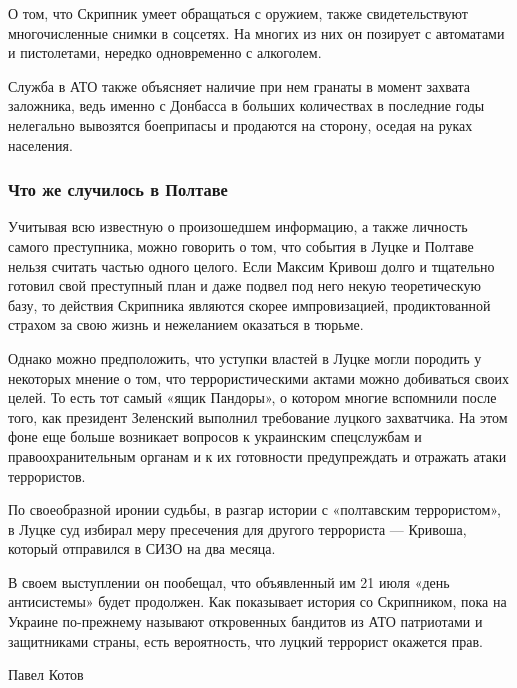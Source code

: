 \documentclass[a4paper,11pt]{extreport}
\begin{document}
О том, что Скрипник умеет обращаться с оружием, также свидетельствуют
многочисленные снимки в соцсетях. На многих из них он позирует с автоматами и
пистолетами, нередко одновременно с алкоголем.

Служба в АТО также объясняет наличие при нем гранаты в момент захвата
заложника, ведь именно с Донбасса в больших количествах в последние годы
нелегально вывозятся боеприпасы и продаются на сторону, оседая на руках
населения.

\subsubsection{Что же случилось в Полтаве}

Учитывая всю известную о произошедшем информацию, а также личность самого
преступника, можно говорить о том, что события в Луцке и Полтаве нельзя считать
частью одного целого. Если Максим Кривош долго и тщательно готовил свой
преступный план и даже подвел под него некую теоретическую базу, то действия
Скрипника являются скорее импровизацией, продиктованной страхом за свою жизнь и
нежеланием оказаться в тюрьме.

Однако можно предположить, что уступки властей в Луцке могли породить у
некоторых мнение о том, что террористическими актами можно добиваться своих
целей. То есть тот самый «ящик Пандоры», о котором многие вспомнили после того,
как президент Зеленский выполнил требование луцкого захватчика. На этом фоне
еще больше возникает вопросов к украинским спецслужбам и правоохранительным
органам и к их готовности предупреждать и отражать атаки террористов. 

По своеобразной иронии судьбы, в разгар истории с «полтавским террористом», в
Луцке суд избирал меру пресечения для другого террориста --- Кривоша, который
отправился в СИЗО на два месяца. 

В своем выступлении он пообещал, что объявленный им 21 июля «день антисистемы»
будет продолжен. Как показывает история со Скрипником, пока на Украине
по-прежнему называют откровенных бандитов из АТО патриотами и защитниками
страны, есть вероятность, что луцкий террорист окажется прав.

Павел Котов
  
 
 
\end{document}
